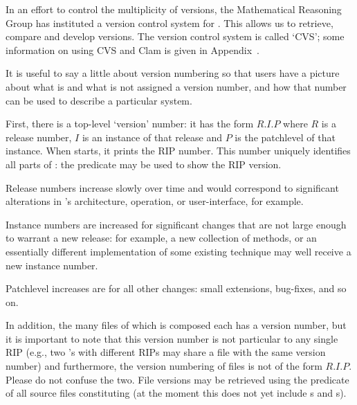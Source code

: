 In an effort to control the multiplicity of versions, the Mathematical
Reasoning Group has instituted a version control system for \clam.
This allows us to retrieve, compare and develop \clam{} versions.  The 
version control system is called `CVS'; some information on using CVS
and Clam is given in Appendix~.

  It is useful to say a
little about version numbering so that users have a picture about what
is and what is not assigned a version number, and how that number can
be used to describe a particular \clam{} system.

First, there is a top-level \clam{} `version' number: it has the form
$R.I.P$ where $R$ is a release number, $I$ is an instance of that
release and $P$ is the patchlevel of that instance.  When \clam{}
starts, it prints the RIP number.  This number uniquely identifies all
parts of \clam: the predicate  may be used to show
the RIP version.

Release numbers increase slowly over time and would correspond to
significant alterations in \clam's architecture, operation, or
user-interface, for example.

Instance numbers are increased for significant changes that are not
large enough to warrant a new release: for example, a new collection
of methods, or an essentially different implementation of some
existing technique may well receive a new instance number.

Patchlevel increases are for all other changes: small extensions,
bug-fixes, and so on.

In addition, the many files of which \clam{} is composed each has a
version number, but it is important to note that this version number
is not particular to any single RIP (e.g., two \clam's with different
RIPs may share a file with the same version number) and furthermore,
the version numbering of files is not of the form $R.I.P$.  Please do
not confuse the two.  File versions may be retrieved using the
predicate  of all source files constituting \clam{}
(at the moment this does not yet include s and s).


